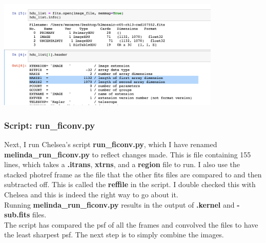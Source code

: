 \documentclass[11pt,letterpaper]{book} %
\begin{document}
\begin{center}
\includegraphics[width=0.8\textwidth]{header.png}
\end{center}

\subsubsection*{Script: run\_ficonv.py}
Next, I run Chelsea's script \textbf{run\_ficonv.py}, which I have renamed \textbf{melinda\_run\_ficonv.py} to reflect changes made. This is file containing 155 lines, which takes a \textbf{.itrans}, \textbf{xtrns}, and a \textbf{region} file to run. I also use the stacked photref frame as the file that the other fits files are compared to and then subtracted off. This is called the \textbf{reffile} in the script. I double checked this with Chelsea and this is indeed the right way to go about it. \\
Running \textbf{melinda\_run\_ficonv.py} results in the output of \textbf{.kernel} and \textbf{-sub.fits} files. \\ 
The script has compared the psf of all the frames and convolved the files to have the least sharpest psf. 
The next step is to simply combine the images.

\end{document}
